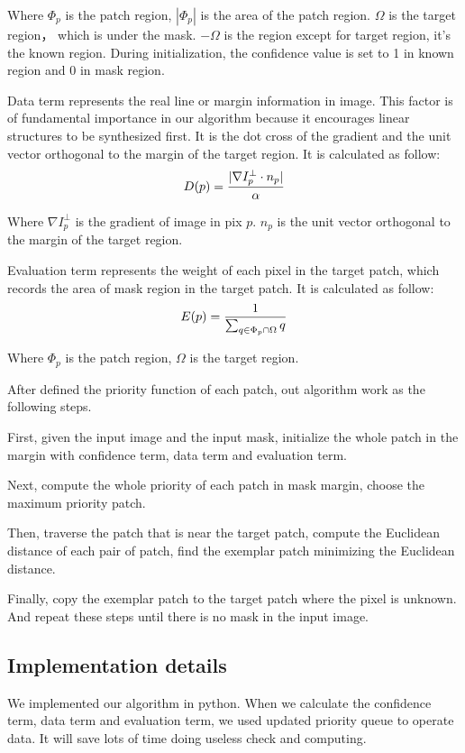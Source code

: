 Where $\Phi_p$ is the patch region, $|\Phi_p|$ is the area of the patch region. $\Omega$ is the target region， which is under the mask. $-\Omega$ is the region except for target region, it's the known region. During initialization, the confidence value is set to 1 in known region and 0 in mask region. 

Data term represents the real line or margin information in image. This factor is of
fundamental importance in our algorithm because it encourages linear structures to be synthesized first. It is the dot cross of the gradient and the unit vector orthogonal to the margin of the target region. It is calculated as follow:
\begin{equation*}
\centering
D(p)=\frac{|\nabla I^\bot_p \cdot n_p|}{\alpha}
\nonumber
\end{equation*}

Where $\nabla I^\bot_p$ is the gradient of image in pix $p$. $n_p$ is the unit vector orthogonal to the margin of the target region.

Evaluation term represents the weight of each pixel in the target patch, which records the area of mask region in the target patch. It is calculated as follow:
\begin{equation*}
\centering
E(p)=\frac{1}{\sum_{q \in \Phi_p \cap \Omega}q}
\nonumber
\end{equation*}

Where $\Phi_p$ is the patch region, $\Omega$ is the target region.

After defined the priority function of each patch, out algorithm work as the following steps.

First, given the input image and the input mask, initialize the whole patch in the margin with confidence term, data term and evaluation term. 

Next, compute the whole priority of each patch in mask margin, choose the maximum priority patch.

Then, traverse the patch that is near the target patch, compute the Euclidean distance of each pair of patch, find the exemplar patch minimizing the Euclidean distance.

Finally, copy the exemplar patch to the target patch where the pixel is unknown. And repeat these steps until there is no mask in the input image.

\subsection{Implementation details}
We implemented our algorithm in python. When we calculate the confidence term, data term and evaluation term, we used updated priority queue to operate data. It will save lots of time doing useless check and computing. 

